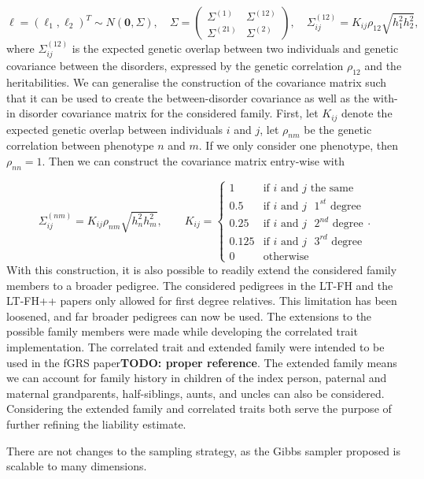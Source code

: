 \begin{equation*}
	\ell = \left(\ell_1, \ell_2\right)^T \sim N(\mathbf{0}, \Sigma), \quad \Sigma = 
	\begin{pmatrix} 
		\Sigma^{(1)} & \Sigma^{(12)} \\
		\Sigma^{(21)} & \Sigma^{(2)} 
	\end{pmatrix}, \quad \Sigma^{(12)}_{ij} = K_{ij}\rho_{12}\sqrt{h_1^2 h_2^2},
\end{equation*}
where $ \Sigma_{ij}^{(12)} $ is the expected genetic overlap between two individuals and genetic covariance between the disorders, expressed by the genetic correlation $ \rho_{12} $ and the heritabilities. We can generalise the construction of the covariance matrix such that it can be used to create the between-disorder covariance as well as the with-in disorder covariance matrix for the considered family. First, let $ K_{ij} $ denote the expected genetic overlap between individuals $ i $ and $ j $, let $ \rho_{nm} $ be the genetic correlation between phenotype $ n $ and $ m $. If we only consider one phenotype, then $ \rho_{nn} = 1$. Then we can construct the covariance matrix entry-wise with 

\begin{equation*}
	\Sigma^{(nm)}_{ij} = K_{ij} \rho_{nm}\sqrt{h^2_{n}h^2_{m}}, \qquad K_{ij} = 
	\begin{cases} 
		1 		& \text{if } i \text{ and } j \text{ the same} \\
		0.5 	& \text{if } i \text{ and } j \text{ $1^{st}$ degree} \\
		0.25 	& \text{if } i \text{ and } j \text{ $2^{nd}$ degree} \\ 
		0.125 	& \text{if } i \text{ and } j \text{ $3^{rd}$ degree}  \\
		0 		& \text{otherwise}
	\end{cases}.
\end{equation*}
With this construction, it is also possible to readily extend the considered family members to a broader pedigree. The considered pedigrees in the LT-FH and the LT-FH++ papers only allowed for first degree relatives. This limitation has been loosened, and far broader pedigrees can now be used. The extensions to the possible family members were made while developing the correlated trait implementation. The correlated trait and extended family were intended to be used in the fGRS paper\textbf{TODO: proper reference}. The extended family means we can account for family history in children of the index person, paternal and maternal grandparents, half-siblings, aunts, and uncles can also be considered. Considering the extended family and correlated traits both serve the purpose of further refining the liability estimate.

There are not changes to the sampling strategy, as the Gibbs sampler proposed is scalable to many dimensions.
